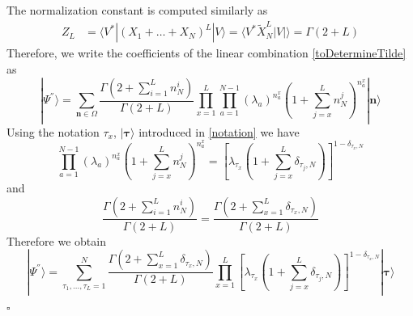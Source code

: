 \documentclass[10pt]{article}
\numberwithin{equation}{section}
\numberwithin{equation}{subsection}
\begin{document}
The normalization constant is computed similarly as 
\begin{align*}
	Z_{L}&=\langle V^{*}|(X_{1}+\ldots+X_{N})^{L}|V\rangle=\langle V^{*}\widetilde{X}_{N}^{L}|V|\rangle=
	\Gamma(2+L)
\end{align*}
Therefore, we write the coefficients of the linear combination \eqref{toDetermineTilde} as 
\begin{equation}\label{resulEsteady}
	|\Psi^{''}\rangle= \sum_{\bm{n}\in \Omega}\frac{\Gamma(2+\sum_{i=1}^{L}n_{N}^{i})}{\Gamma(2+L)}\prod_{x=1}^{L}\prod_{a=1}^{N-1}\left(\lambda_{a}\right)^{n_{a}^{x}}\left(1+\sum_{j=x}^{L}n_{N}^{j}\right)^{n_{a}^{x}}|\bm{n}\rangle
\end{equation}
Using the notation $\tau_{x}$, $|\bm{\tau}\rangle $ introduced in \eqref{notation} we have 
\begin{equation}
	\prod_{a=1}^{N-1}\left(\lambda_{a}\right)^{n_{a}^{x}}\left(1+\sum_{j=x}^{L}n_{N}^{j}\right)^{n_{a}^{x}}=\left[\lambda_{\tau_{x}}\left(1+\sum_{j=x}^{L}\delta_{\tau_{j},N}\right)\right]^{1-\delta_{\tau_{x},N}}
\end{equation}
and 
\begin{equation}
	\frac{\Gamma(2+\sum_{i=1}^{L}n_{N}^{i})}{\Gamma(2+L)}=\frac{\Gamma\left(2+\sum_{x=1}^{L}\delta_{\tau_{x},N}\right)}{\Gamma\left(2+L\right)}
\end{equation}
Therefore we obtain
\begin{equation}
|\Psi^{''}\rangle=\sum_{\tau_{1},\ldots,\tau_{L}=1}^{N}\frac{\Gamma\left(2+\sum_{x=1}^{L}\delta_{\tau_{x},N}\right)}{\Gamma\left(2+L\right)}\prod_{x=1}^{L}\left[\lambda_{\tau_{x}}\left(1+\sum_{j=x}^{L}\delta_{\tau_{j},N}\right)\right]^{1-\delta_{\tau_{x},N}}|\mathbf{\bm{\tau}}\rangle
\end{equation}
\begin{flushright}
$\square$
\end{flushright}
\end{document}
